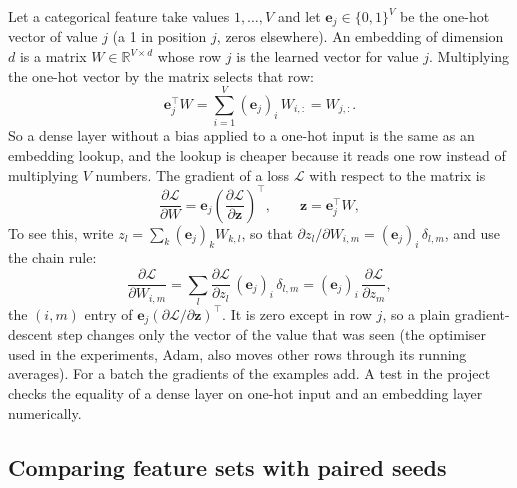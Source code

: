 Let a categorical feature take values $1, \dots, V$ and let $\mathbf{e}_j \in \{0,1\}^{V}$ be the one-hot vector of value $j$ (a 1 in position $j$, zeros elsewhere). An embedding of dimension $d$ is a matrix $W \in \mathbb{R}^{V \times d}$ whose row $j$ is the learned vector for value $j$. Multiplying the one-hot vector by the matrix selects that row:
\begin{equation}
\mathbf{e}_j^{\top} W = \sum_{i=1}^{V} (\mathbf{e}_j)_i\, W_{i,:} = W_{j,:} .
\end{equation}
So a dense layer without a bias applied to a one-hot input is the same as an embedding lookup, and the lookup is cheaper because it reads one row instead of multiplying $V$ numbers. The gradient of a loss $\mathcal{L}$ with respect to the matrix is
\begin{equation}
\frac{\partial \mathcal{L}}{\partial W} = \mathbf{e}_j \left(\frac{\partial \mathcal{L}}{\partial \mathbf{z}}\right)^{\!\top}, \qquad \mathbf{z} = \mathbf{e}_j^{\top} W ,
\end{equation}
To see this, write $z_l = \sum_k (\mathbf{e}_j)_k W_{k,l}$, so that $\partial z_l / \partial W_{i,m} = (\mathbf{e}_j)_i\,\delta_{l,m}$, and use the chain rule:
\begin{equation}
\frac{\partial \mathcal{L}}{\partial W_{i,m}} = \sum_l \frac{\partial \mathcal{L}}{\partial z_l}\,(\mathbf{e}_j)_i\,\delta_{l,m} = (\mathbf{e}_j)_i\,\frac{\partial \mathcal{L}}{\partial z_m} ,
\end{equation}
the $(i,m)$ entry of $\mathbf{e}_j (\partial \mathcal{L}/\partial \mathbf{z})^{\top}$. It is zero except in row $j$, so a plain gradient-descent step changes only the vector of the value that was seen (the optimiser used in the experiments, Adam, also moves other rows through its running averages). For a batch the gradients of the examples add. A test in the project checks the equality of a dense layer on one-hot input and an embedding layer numerically.

\subsection{Comparing feature sets with paired seeds}
\label{sec:math-paired}

